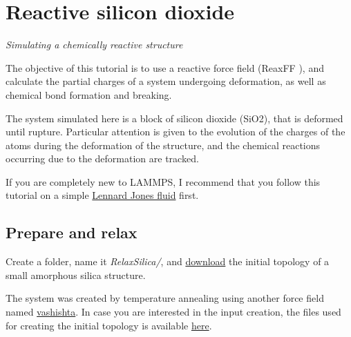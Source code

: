 \chapter{Reactive silicon dioxide}
\label{reactive-silicon-dioxide-label}

\noindent \vspace{-1cm} \noindent \textcolor{graytitle}{\textit{{\Large Simulating a chemically reactive structure}}\vspace{0.5cm} }

\vspace{0.25cm} \noindent The objective of this tutorial is to use a 
reactive force field (ReaxFF \cite{van2001reaxff, zou2012investigation}),
and calculate the partial charges of a system undergoing
deformation, as well as chemical bond formation and breaking.  

\vspace{0.25cm} \noindent The system simulated here is a block of silicon dioxide (SiO2), that is deformed 
until rupture. Particular attention is given to the evolution of the charges
of the atoms during the deformation of the structure, and 
the chemical reactions occurring due to the deformation
are tracked.

\vspace{0.25cm} \noindent If you are completely new to LAMMPS, I recommend that
you follow this tutorial on a simple \hyperref[lennard-jones-label]{Lennard Jones fluid} first.

\section{Prepare and relax}
\noindent Create a folder, name it \textit{RelaxSilica/},
and \href{https://lammpstutorials.github.io/lammpstutorials-inputs/level3/reactive-silicon-dioxide/RelaxSilica/silica.data}{download} the initial topology of a small
amorphous silica structure.

\begin{tcolorbox}[colback=mylightblue!5!white,colframe=mylightblue!75!black,title=About the initial structure]

\vspace{0.25cm} \noindent The system was created by temperature annealing using another force field 
named \href{https://lammpstutorials.github.io/lammpstutorials-inputs/level3/reactive-silicon-dioxide/CreateSilica/SiO.1990.vashishta}{vashishta}. In case you are
interested in the input creation, the files
used for creating the initial topology is available
\href{https://lammpstutorials.github.io/lammpstutorials-inputs/level3/reactive-silicon-dioxide/CreateSilica/input.lammps}{here}.
\end{tcolorbox}

